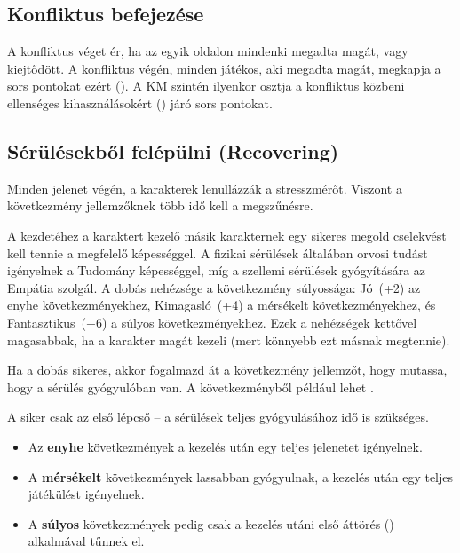 \subsection{Konfliktus befejezése}

A konfliktus véget ér, ha az egyik oldalon mindenki megadta magát, vagy kiejtődött. A konfliktus végén, minden játékos, aki megadta magát, megkapja a sors pontokat ezért (). A KM szintén ilyenkor osztja a konfliktus közbeni ellenséges kihasználásokért () járó sors pontokat.

\subsection[Sérülésekből felépülni]{Sérülésekből felépülni (Recovering)}

Minden jelenet végén, a karakterek lenullázzák a stresszmérőt. Viszont a következmény jellemzőknek több idő kell a megszűnésre.

A  kezdetéhez a karaktert kezelő másik karakternek egy sikeres megold cselekvést kell tennie a megfelelő képességgel. A fizikai sérülések általában orvosi tudást igényelnek a Tudomány képességgel, míg a szellemi sérülések gyógyítására az Empátia szolgál. A dobás nehézsége a következmény súlyossága: Jó~(+2) az enyhe következményekhez, Kimagasló~(+4) a mérsékelt következményekhez, és Fantasztikus~(+6) a súlyos következményekhez. Ezek a nehézségek kettővel magasabbak, ha a karakter magát kezeli (mert könnyebb ezt másnak megtennie).

Ha a dobás sikeres, akkor fogalmazd át a következmény jellemzőt, hogy mutassa, hogy a sérülés gyógyulóban van. A  következményből például lehet .

A siker csak az első lépcső -- a sérülések teljes gyógyulásához idő is szükséges.

\begin{itemize}
    \item Az \textbf{enyhe} következmények a kezelés után egy teljes jelenetet igényelnek.
    \item A \textbf{mérsékelt} következmények lassabban gyógyulnak, a kezelés után egy teljes játékülést igényelnek.
    \item A \textbf{súlyos} következmények pedig csak a kezelés utáni első áttörés () alkalmával tűnnek el.
\end{itemize}
